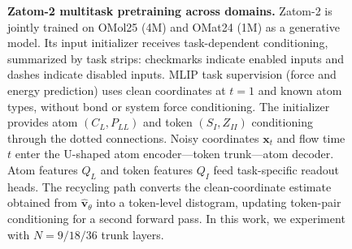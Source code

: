 \begin{figure}[t]
{%
  }

  \caption{\textbf{Zatom-2 multitask pretraining across domains.}
  Zatom-2 is jointly trained on OMol25 (4M) and OMat24 (1M) as a generative model. Its input initializer receives task-dependent conditioning, summarized by task strips: checkmarks indicate enabled inputs and dashes indicate disabled inputs. 
  MLIP task supervision (force and energy prediction) uses clean coordinates at $t=1$ and known atom types, without bond or system force conditioning. The initializer provides atom $(C_L,P_{LL})$ and token $(S_I,Z_{II})$ conditioning through the dotted connections. Noisy coordinates $\mathbf{x}_t$ and flow time $t$ enter the U-shaped atom encoder---token trunk---atom decoder.
  Atom features $Q_L$ and token features $Q_I$ feed task-specific readout heads. 
  The recycling path converts the clean-coordinate estimate obtained from $\widehat{\mathbf{v}}_\theta$ into a token-level distogram, updating token-pair conditioning for a second forward pass. In this work, we experiment with $N=9/18/36$ trunk layers.}
  \label{fig:zatom2-overview}
  \endgroup
\end{figure}
